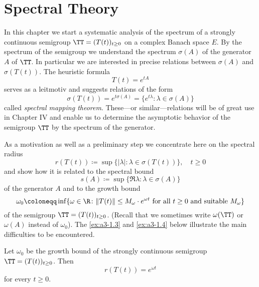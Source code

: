 \chapter{Spectral Theory}\label{chap:A-III}


In this chapter we start a systematic analysis of the spectrum of a strongly continuous semigroup $\TT = (T(t))_{t\geq 0}$ on a complex Banach space $E$.
By the spectrum of the semigroup we understand the spectrum $\sigma(A)$ of the generator $A$ of $\TT$.
In particular we are interested in precise relations between $\sigma(A)$ and $\sigma(T(t))$.
The heuristic formula
\[
T(t) = e^{tA}
\]
serves as a leitmotiv and suggests relations of the form
\[
\sigma(T(t)) = e^{t\sigma(A)} = \{ e^{t\lambda} \colon \lambda \in \sigma(A) \}
\]
called \emph{spectral mapping theorem}.
These---or similar---relations will be of great use in Chapter IV and enable us to determine the asymptotic behavior of the semigroup $\TT$ by the spectrum of the generator.

As a motivation as well as a preliminary step we concentrate here on the spectral radius
\[
r(T(t)) \coloneqq \sup \{ |\lambda| \colon \lambda \in \sigma(T(t)) \}, \quad t \geq 0
\]
and show how it is related to the spectral bound
\[
s(A) \coloneqq \sup \{ \Re\lambda \colon \lambda \in \sigma(A) \}
\]
of the generator $A$ and to the growth bound
\[
\omega_{0} \coloneqq \inf \{\omega \in \R \colon \|T(t)\| \leq M_{\omega}\cdot e^{\omega t} \text{ for all } t \geq 0 \text{ and suitable } M_{\omega}\}
\]
of the semigroup $\TT = (T(t))_{t\geq 0}$.
(Recall that we sometimes write $\omega(\TT)$ or $\omega(A)$ instead of $\omega_{0}$).
The \ref{ex:a3-1.3}  and \ref{ex:a3-1.4} below illustrate the main difficulties to be encountered.
\begin{proposition}\label{prop:1.1}
Let $\omega_{0}$ be the growth bound of the strongly continuous semigroup $\TT = (T(t))_{t\geq 0}$.
Then
\[
r(T(t)) = e^{\omega t}
\]
for every $t \geq 0$.
\end{proposition}

